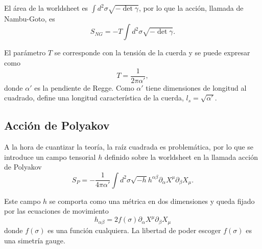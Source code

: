 El área de la worldsheet es $\int d^2\sigma \sqrt{-\det\gamma}$, por lo que la acción, llamada de Nambu-Goto, es
\begin{equation}
  S_{NG}=-T\int d^2\sigma \sqrt{-\det\gamma}.
\end{equation}

El parámetro $T$ se corresponde con la tensión de la cuerda y se puede expresar como
\begin{equation}
  T=\frac{1}{2\pi\alpha'},
\end{equation}
donde $\alpha'$ es la pendiente de Regge.
Como $\alpha'$ tiene dimensiones de longitud al cuadrado, define una longitud característica
de la cuerda, $l_s=\sqrt{\alpha'}$.

\subsection{Acción de Polyakov}

A la hora de cuantizar la teoría, la raíz cuadrada es problemática, por lo que se introduce
un campo tensorial $h$ definido sobre la worldsheet en la llamada acción de Polyakov
\begin{equation}
  S_P=-\frac{1}{4\pi\alpha'}\int d^2\sigma  \sqrt{-h}h^{\alpha\beta}\partial_\alpha X^\mu \partial_\beta X_\mu.
\end{equation}

Este campo $h$ se comporta como una métrica en dos dimensiones y queda fijado por las
ecuaciones de movimiento
\begin{equation}
  h_{\alpha\beta}=2f(\sigma)\partial_\alpha X^\mu \partial_\beta X_\mu
\end{equation}
donde $f(\sigma)$ es una función cualquiera. La libertad de poder escoger $f(\sigma)$
es una simetría gauge.

